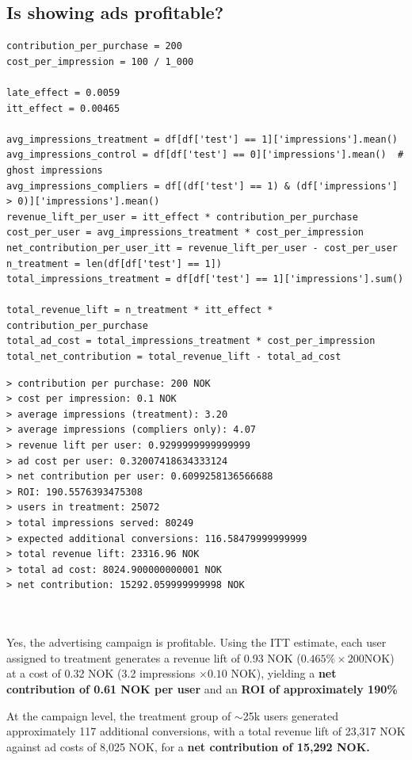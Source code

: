 \documentclass[10pt]{article}
\begin{document}
\subsection{Is showing ads profitable?}
\begin{lstlisting}
contribution_per_purchase = 200
cost_per_impression = 100 / 1_000

late_effect = 0.0059 
itt_effect = 0.00465

avg_impressions_treatment = df[df['test'] == 1]['impressions'].mean()
avg_impressions_control = df[df['test'] == 0]['impressions'].mean()  # ghost impressions
avg_impressions_compliers = df[(df['test'] == 1) & (df['impressions'] > 0)]['impressions'].mean()
revenue_lift_per_user = itt_effect * contribution_per_purchase
cost_per_user = avg_impressions_treatment * cost_per_impression
net_contribution_per_user_itt = revenue_lift_per_user - cost_per_user
n_treatment = len(df[df['test'] == 1])
total_impressions_treatment = df[df['test'] == 1]['impressions'].sum()

total_revenue_lift = n_treatment * itt_effect * contribution_per_purchase
total_ad_cost = total_impressions_treatment * cost_per_impression
total_net_contribution = total_revenue_lift - total_ad_cost
\end{lstlisting}
\begin{verbatim}
> contribution per purchase: 200 NOK
> cost per impression: 0.1 NOK
> average impressions (treatment): 3.20
> average impressions (compliers only): 4.07
> revenue lift per user: 0.9299999999999999
> ad cost per user: 0.32007418634333124
> net contribution per user: 0.6099258136566688
> ROI: 190.5576393475308
> users in treatment: 25072
> total impressions served: 80249
> expected additional conversions: 116.58479999999999
> total revenue lift: 23316.96 NOK
> total ad cost: 8024.900000000001 NOK
> net contribution: 15292.059999999998 NOK



\end{verbatim}
Yes, the advertising campaign is profitable. Using the ITT estimate, each user assigned to treatment generates a revenue lift of 0.93 NOK ($0.465\%\times 200 \text{NOK} $) at a cost of 0.32 NOK (3.2 impressions $\times 0.10 $ NOK), yielding a \textbf{net contribution of 0.61 NOK per user} and an \textbf{ROI of approximately 190\%}

At the campaign level, the treatment group of $\sim $25k users generated approximately 117 additional conversions, with a total revenue lift of 23,317 NOK against ad costs of 8,025 NOK, for a \textbf{net contribution of 15,292 NOK.}
\end{document}
